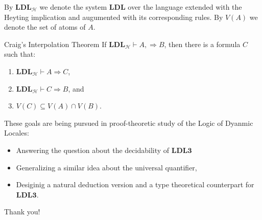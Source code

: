 \documentclass[handout]{beamer}
\begin{document}
\begin{frame}{\subResults}
	By $\mathbf{LDL}_\mathcal{H}$ we denote the system $\mathbf{LDL}$ over the language extended with the Heyting implication and augumented with its corresponding rules. By $V(A)$ we denote the set of atoms of $A$.
	\begin{exampleblock}{Craig's Interpolation Theorem}
		If $\mathbf{LDL}_\mathcal{H} \vdash A , \Rightarrow B$, then there is a formula $C$ such that:
  \begin{enumerate}
    \item $\mathbf{LDL}_\mathcal{H} \vdash A \Rightarrow C$,
    \item $\mathbf{LDL}_\mathcal{H} \vdash C \Rightarrow B$, and
    \item $V(C) \subseteq V(A) \cap V(B)$.
  \end{enumerate}
	\end{exampleblock}
\end{frame}

\begin{frame}{\subFurther}
	These goals are being pursued in proof-theoretic study of the Logic of Dyanmic Locales:
	\begin{itemize}
		\item Answering the question about the decidability of $\mathbf{LDL3}$
		\item Generalizing a similar idea about the universal quantifier,
		\item Desiginig a natural deduction version and a type theoretical counterpart for $\mathbf{LDL3}$.
	\end{itemize}
\end{frame}


\nocite{akbar2024generalization}
\nocite{akbar2024geometric}



\begin{frame}[noframenumbering]{\quad}
	\begin{center}
		\Huge Thank you!
	\end{center}
\end{frame}
\end{document}
